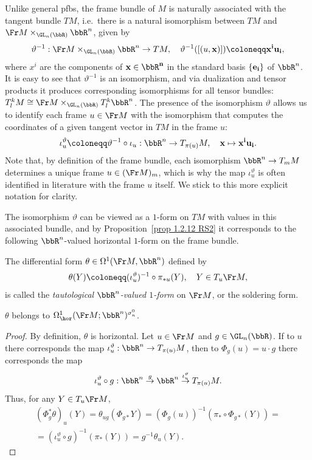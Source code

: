 Unlike general \glspl{pfb}, the frame bundle of $M$ is naturally associated with the tangent bundle $TM$, i.e.\ there is a natural isomorphism between $TM$ and  $\Fr M\times_{\GL_n(\bbR)}\bbR^n$, given by
\[\vartheta^{-1}:\Fr M \times_{\GL_n(\bbR)} \bbR^n\to TM,\quad \vartheta^{-1}([(u,\bf{x})])\coloneqq x^iu_i,\label{eq 2.1.2 RS2}\]
where $x^i$ are the components of $\bf{x}\in\bbR^n$ in the standard basis $\{\bf{e}_i\}$ of $\bbR^n$. It is easy to see that $\vartheta^{-1}$ is an isomorphism, and via dualization and tensor products it produces corresponding isomorphisms for all tensor bundles: $T^k_l M\cong \Fr M\times_{\GL_n(\bbR)}T^k_l\bbR^n$. The presence of the isomorphism $\vartheta$ allows us to identify each frame $u\in \Fr M$ with the isomorphism that computes the coordinates of a given tangent vector in $TM$ in the frame $u$:
\[\iota_u^\vartheta\coloneqq \vartheta^{-1}\circ\iota_u:\bbR^n\to T_{\pi(u)}M,\quad \bf{x}\mapsto x^i u_i.\]
Note that, by definition of the frame bundle, each isomorphism $\bbR^n\to T_mM$ determines a unique frame $u\in (\Fr M)_m$, which is why the map $\iota_u^\vartheta$ is often identified in literature with the frame $u$ itself. We stick to this more explicit notation for clarity.

The isomorphism $\vartheta$ can be viewed as a $1$-form on $TM$ with values in this associated bundle, and by Proposition~\ref{prop 1.2.12 RS2} it corresponds to the following $\bbR^n$-valued horizontal $1$-form on the frame bundle.

\begin{defn}
    The differential form $\theta\in\Omega^1(\Fr M,\bbR^n)$ defined by
    \[\theta(Y)\coloneqq (\iota_u^\vartheta)^{-1}\circ\pi_{\ast u}(Y),\quad Y\in T_u\Fr M,\]
    is called the \emph{tautological $\bbR^n$-valued $1$-form} on $\Fr M$, or the soldering form.
\end{defn}


\begin{prop}[{{\cite[Prop.~2.1.4]{RS2}}}]\label{prop 2.1.4 RS2}
    $\theta$ belongs to $\Omega^1_{\hor}(\Fr M; \bbR^n)^{\sigma_n^0}$.
\end{prop}
\begin{proof}
    By definition, $\theta$ is horizontal. Let $u\in\Fr M$ and $g\in \GL_n(\bbR)$. If to $u$ there corresponds the map $\iota^\vartheta_u:\bbR^n\to T_{\pi(u)}M$, then to $\Phi_g(u)=u\cdot g$ there corresponds the map
    \[\iota_u^\vartheta\circ g:\bbR^n\overset{g}{\to} \bbR^n\overset{\iota_u^\vartheta}{\to} T_{\pi(u)}M.\] 
    Thus, for any $Y\in T_u \Fr M$,
    \begin{multline}
        (\Phi^\ast_g \theta)_u(Y)=\theta_{ug}(\Phi_{g\ast}Y)=(\Phi_g(u))^{-1}(\pi_\ast\circ \Phi_{g\ast}(Y))=\\
        =(\iota_u^\vartheta\circ g)^{-1}(\pi_\ast (Y))=g^{-1}\theta_u(Y).
    \end{multline}
\end{proof}

